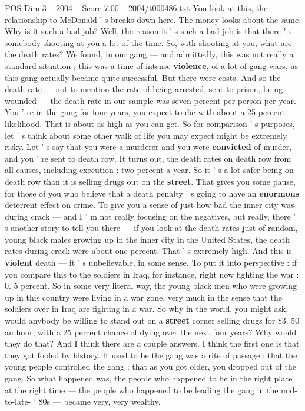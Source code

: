 \begin{textsample}{POS Dim 3 – 2004 – Score 7.00 – 2004/t000486.txt}
You look at this, the relationship to McDonald ' s breaks down here.
The money looks about the same.
Why is it such a bad job?
Well, the reason it ' s such a bad job is that there ' s somebody shooting at you a lot of the time.
So, with shooting at you, what are the death rates?
We found, in our gang — and admittedly, this was not really a standard situation ; this was a time of intense \textbf{violence}, of a lot of gang wars, as this gang actually became quite successful.
But there were costs.
And so the death rate — not to mention the rate of being arrested, sent to prison, being wounded — the death rate in our sample was seven percent per person per year.
You ' re in the gang for four years, you expect to die with about a 25 percent likelihood.
That is about as high as you can get.
So for comparison ' s purposes, let ' s think about some other walk of life you may expect might be extremely risky.
Let ' s say that you were a murderer and you were \textbf{convicted} of murder, and you ' re sent to death row.
It turns out, the death rates on death row from all causes, including execution : two percent a year.
So it ' s a lot safer being on death row than it is selling drugs out on the \textbf{street}.
That gives you some pause, for those of you who believe that a death penalty ' s going to have an \textbf{enormous} deterrent effect on crime.
To give you a sense of just how bad the inner city was during crack — and I ' m not really focusing on the negatives, but really, there ' s another story to tell you there — if you look at the death rates just of random, young black males growing up in the inner city in the United States, the death rates during crack were about one percent.
That ' s extremely high.
And this is \textbf{violent} death — it ' s unbelievable, in some sense.
To put it into perspective : if you compare this to the soldiers in Iraq, for instance, right now fighting the war : 0. 5 percent.
So in some very literal way, the young black men who were growing up in this country were living in a war zone, very much in the sense that the soldiers over in Iraq are fighting in a war.
So why in the world, you might ask, would anybody be willing to stand out on a \textbf{street} corner selling drugs for \$3. 50 an hour, with a 25 percent chance of dying over the next four years?
Why would they do that?
And I think there are a couple answers.
I think the first one is that they got fooled by history.
It used to be the gang was a rite of passage ; that the young people controlled the gang ; that as you got older, you dropped out of the gang.
So what happened was, the people who happened to be in the right place at the right time — the people who happened to be leading the gang in the mid-to-late- ' 80s — became very, very wealthy.

\end{textsample}

